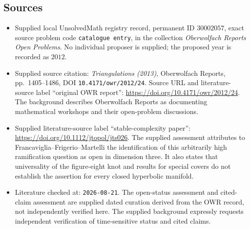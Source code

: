 \documentclass[11pt]{article}
\begin{document}
\subsection{Sources}
\begin{itemize}
\item Supplied local UnsolvedMath registry record, permanent ID \(30002057\), exact source problem code \texttt{catalogue entry}, in the collection \emph{Oberwolfach Reports Open Problems}. No individual proposer is supplied; the proposed year is recorded as \(2012\).
\item Supplied source citation: \emph{Triangulations (2013)}, Oberwolfach Reports, pp.~1405--1486, DOI \texttt{10.4171/owr/2012/24}. Source URL and literature-source label ``original OWR report'': \url{https://doi.org/10.4171/owr/2012/24}. The background describes Oberwolfach Reports as documenting mathematical workshops and their open-problem discussions.
\item Supplied literature-source label ``stable-complexity paper'': \url{https://doi.org/10.1112/jtopol/jts026}. The supplied assessment attributes to Francaviglia--Frigerio--Martelli the identification of this arbitrarily high ramification question as open in dimension three. It also states that universality of the figure-eight knot and results for special covers do not establish the assertion for every closed hyperbolic manifold.
\item Literature checked at: \texttt{2026-08-21}. The open-status assessment and cited-claim assessment are supplied dated curation derived from the OWR record, not independently verified here. The supplied background expressly requests independent verification of time-sensitive status and cited claims.
\end{itemize}
\end{document}
